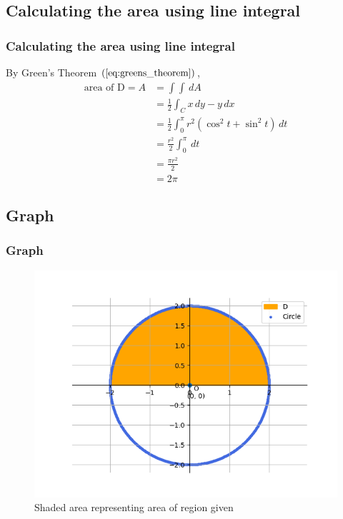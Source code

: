 \documentclass{beamer}
\providecommand{\brak}[1]{\ensuremath{\left(#1\right)}}
\theoremstyle{remark}
\numberwithin{equation}{section}
\begin{document}
\subsection{Calculating the area using line integral}
\begin{frame}
\frametitle{Calculating the area using line integral}

By Green's Theorem $\brak{\ref{eq:greens_theorem}}$,
\begin{align}
	\text{area of D}  = A &= \int \int \, dA\\
	&= \frac{1}{2} \int_{C} x\, dy - y\, dx\\
	&= \frac{1}{2} \int_{0}^{\pi} r^2\brak{\cos^2{t} + \sin^2{t}} \, dt\\
	&= \frac{r^2}{2} \int_{0}^{\pi} \, dt\\
	&= \frac{\pi r^2}{2}\\
	&= 2\pi
\end{align}

\end{frame}

\subsection{Graph}
\begin{frame}
\frametitle{Graph}

\begin{figure}[h!]
   \centering
   \includegraphics[width=0.7\linewidth]{figs/graph.png}
   \caption{Shaded area representing area of region given}
\end{figure}

\end{frame}

\end{document}
